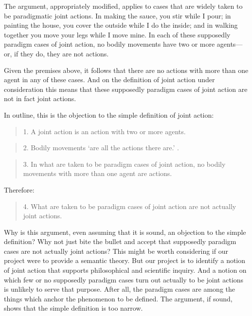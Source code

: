 \documentclass[12pt,a4paper]{extarticle}
\begin{document}
The argument, appropriately modified, applies to cases that are widely taken to be paradigmatic joint actions.
In making the sauce, you stir while I pour;
in painting the house, you cover the outside while I do the inside; 
and in walking together you move your legs while I move mine.
In each of these supposedly paradigm cases of joint action, no bodily movements have two or more agents---or, if they do, they are not actions.
\begin{comment}
\footnote{
The qualification `irreducibly' may be necessary if composite bodily movements may themselves be bodily movements.
What does `irreducible' mean?
We stipulate that an individual is \emph{irreducibly} an agent of a bodily movement if for every part of that bodily movement which is itself a bodily movement, the individual is an agent of the part.
A bodily movement \emph{irreducibly} has exactly $n$ agents if exactly $n$ individuals are irreducibly agents of that bodily movement.
}
\end{comment}
Given the premises above, it follows that there are no actions with more than one agent in any of these cases.
And on the definition of joint action under consideration this means that these supposedly paradigm cases of joint action are not in fact joint actions.

In outline, this is the objection to the simple definition of joint action:
%
\begin{quote}
1. A joint action is an action with two or more agents.
\end{quote}
%
%
\begin{quote}
\label{objection_1_premise_2}
2. Bodily movements `are all the actions there are.'
\citep[p.\ 59]{Davidson:1971fz}.
\end{quote}
%
%
\begin{quote}
3. In what are taken to be paradigm cases of joint action, no  bodily movements with more than one agent are actions.
\end{quote}
%
Therefore:
%
\begin{quote}
4. What are taken to be paradigm cases of joint action are not actually joint actions.
\end{quote}
%
Why is this argument, even assuming that it is sound, an objection to the simple definition?
Why not just bite the bullet and accept that supposedly paradigm cases are not actually joint actions?
This might be worth considering if our project were to provide a semantic theory.
But our project is to identify a notion of joint action that supports philosophical and scientific inquiry.
And a notion on which few or no supposedly paradigm cases turn out actually to be joint actions is unlikely to serve that purpose.
After all, the paradigm cases are among the things which anchor the phenomenon to be defined.
The argument, if sound, shows that the simple definition is too narrow.
\end{document}

